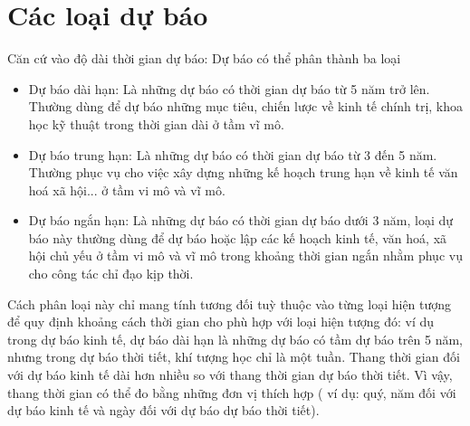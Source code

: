 \section{Các loại dự báo}
\label{sec:intro:phanloai}
Căn cứ vào độ dài thời gian dự báo: Dự báo có thể phân thành ba loại
\begin{itemize}
    \item Dự báo dài hạn: Là những dự báo có thời gian dự báo từ 5 năm trở lên. Thường dùng để dự báo những mục tiêu, chiến lược về kinh tế chính trị, khoa học kỹ thuật trong thời gian dài ở tầm vĩ mô. \\
    \item Dự báo trung hạn: Là những dự báo có thời gian dự báo từ 3 đến 5 năm. Thường phục vụ cho việc xây dựng những kế hoạch trung hạn về kinh tế văn hoá xã hội... ở tầm vi mô và vĩ mô. \\
    \item Dự báo ngắn hạn: Là những dự báo có thời gian dự báo dưới 3 năm, loại dự báo này thường dùng để dự báo hoặc lập các kế hoạch kinh tế, văn hoá, xã hội chủ yếu ở tầm vi mô và vĩ mô trong khoảng thời gian ngắn nhằm phục vụ cho công tác chỉ đạo kịp thời. \\
\end{itemize}
Cách phân loại này chỉ mang tính tương đối tuỳ thuộc vào từng loại hiện tượng để quy định khoảng cách thời gian cho phù hợp với loại hiện tượng đó: ví dụ trong dự báo kinh tế, dự báo dài hạn là những dự báo có tầm dự báo trên 5 năm, nhưng trong dự báo thời tiết, khí tượng học chỉ là một tuần. Thang thời gian đối với dự báo kinh tế dài hơn nhiều so với thang
thời gian dự báo thời tiết. Vì vậy, thang thời gian có thể đo bằng những đơn vị thích hợp ( ví dụ: quý, năm đối với dự báo kinh tế và ngày đối với dự báo dự báo thời tiết).


